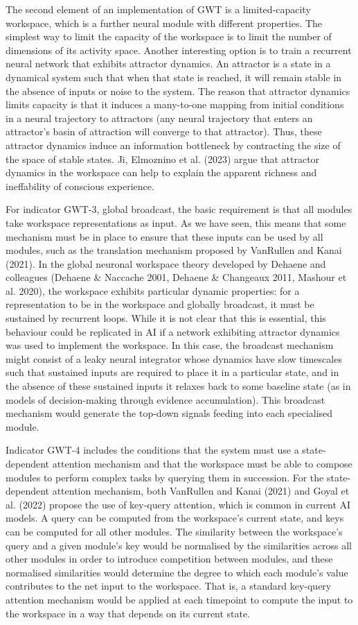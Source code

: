 \documentclass[12pt]{article}
\begin{document}
The second element of an implementation of GWT is a limited-capacity workspace, which is a further neural module with different properties. The simplest way to limit the capacity of the workspace is to limit the number of dimensions of its activity space. Another interesting option is to train a recurrent neural network that exhibits attractor dynamics. An attractor is a state in a dynamical system such that when that state is reached, it will remain stable in the absence of inputs or noise to the system. The reason that attractor dynamics limits capacity is that it induces a many-to-one mapping from initial conditions in a neural trajectory to attractors (any neural trajectory that enters an attractor’s basin of attraction will converge to that attractor). Thus, these attractor dynamics induce an information bottleneck by contracting the size of the space of stable states. Ji, Elmoznino et al. (2023) argue that attractor dynamics in the workspace can help to explain the apparent richness and ineffability of conscious experience.

For indicator GWT-3, global broadcast, the basic requirement is that all modules take workspace representations as input. As we have seen, this means that some mechanism must be in place to ensure that these inputs can be used by all modules, such as the translation mechanism proposed by VanRullen and Kanai (2021). In the global neuronal workspace theory developed by Dehaene and colleagues (Dehaene \& Naccache 2001, Dehaene \& Changeaux 2011, Mashour et al. 2020), the workspace exhibits particular dynamic properties: for a representation to be in the workspace and globally broadcast, it must be sustained by recurrent loops. While it is not clear that this is essential, this behaviour could be replicated in AI if a network exhibiting attractor dynamics was used to implement the workspace. In this case, the broadcast mechanism might consist of a leaky neural integrator whose dynamics have slow timescales such that sustained inputs are required to place it in a particular state, and in the absence of these sustained inputs it relaxes back to some baseline state (as in models of decision-making through evidence accumulation). This broadcast mechanism would generate the top-down signals feeding into each specialised module.

Indicator GWT-4 includes the conditions that the system must use a state-dependent attention mechanism and that the workspace must be able to compose modules to perform complex tasks by querying them in succession. For the state-dependent attention mechanism, both VanRullen and Kanai (2021) and Goyal et al. (2022) propose the use of key-query attention, which is common in current AI models. A query can be computed from the workspace’s current state, and keys can be computed for all other modules. The similarity between the workspace’s query and a given module’s key would be normalised by the similarities across all other modules in order to introduce competition between modules, and these normalised similarities would determine the degree to which each module’s value contributes to the net input to the workspace. That is, a standard key-query attention mechanism would be applied at each timepoint to compute the input to the workspace in a way that depends on its current state.
\end{document}
